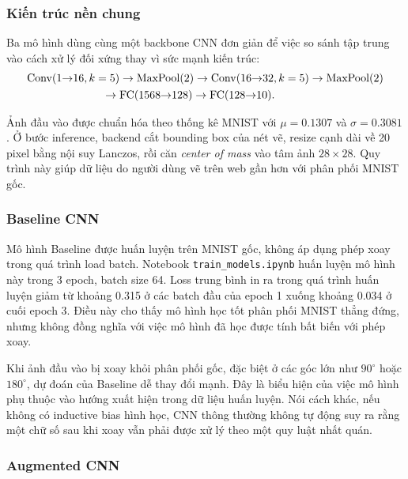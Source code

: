 \subsubsection{Kiến trúc nền chung}

Ba mô hình dùng cùng một backbone CNN đơn giản để việc so sánh tập trung vào cách xử lý đối xứng thay vì sức mạnh kiến trúc:
\begin{equation}
\begin{aligned}
    &\mathrm{Conv}(1{\to}16, k=5) \to \mathrm{MaxPool}(2) \to
    \mathrm{Conv}(16{\to}32, k=5) \to \mathrm{MaxPool}(2) \\
    &\hspace{2.4cm}\to \mathrm{FC}(1568{\to}128) \to \mathrm{FC}(128{\to}10).
\end{aligned}
\label{eq:simplecnn-demo}
\end{equation}

Ảnh đầu vào được chuẩn hóa theo thống kê MNIST với $\mu=0.1307$ và $\sigma=0.3081$. Ở bước inference, backend cắt bounding box của nét vẽ, resize cạnh dài về 20 pixel bằng nội suy Lanczos, rồi căn \textit{center of mass} vào tâm ảnh $28\times28$. Quy trình này giúp dữ liệu do người dùng vẽ trên web gần hơn với phân phối MNIST gốc.

\subsubsection{Baseline CNN}

Mô hình Baseline được huấn luyện trên MNIST gốc, không áp dụng phép xoay trong quá trình load batch. Notebook \texttt{train\_models.ipynb} huấn luyện mô hình này trong 3 epoch, batch size 64. Loss trung bình in ra trong quá trình huấn luyện giảm từ khoảng 0.315 ở các batch đầu của epoch 1 xuống khoảng 0.034 ở cuối epoch 3. Điều này cho thấy mô hình học tốt phân phối MNIST thẳng đứng, nhưng không đồng nghĩa với việc mô hình đã học được tính bất biến với phép xoay.

Khi ảnh đầu vào bị xoay khỏi phân phối gốc, đặc biệt ở các góc lớn như $90^\circ$ hoặc $180^\circ$, dự đoán của Baseline dễ thay đổi mạnh. Đây là biểu hiện của việc mô hình phụ thuộc vào hướng xuất hiện trong dữ liệu huấn luyện. Nói cách khác, nếu không có inductive bias hình học, CNN thông thường không tự động suy ra rằng một chữ số sau khi xoay vẫn phải được xử lý theo một quy luật nhất quán.

\subsubsection{Augmented CNN}

